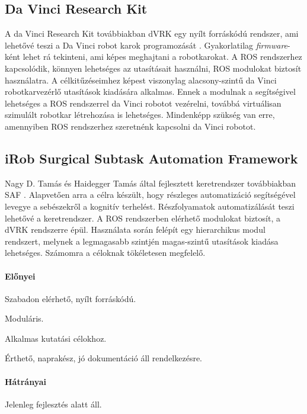 \documentclass[12pt,a4paper,oneside]{report} %
\begin{document}
\subsection{Da Vinci Research Kit}
\label{davinci}
A da Vinci Research Kit továbbiakban dVRK egy nyílt forráskódú rendszer, ami lehetővé teszi a Da Vinci robot karok programozását \cite{kazanzides2014open}. Gyakorlatilag \textit{firmware}-ként lehet rá tekinteni, ami képes meghajtani a robotkarokat.  A ROS rendszerhez kapcsolódik, könnyen lehetséges az utasításait használni, ROS  modulokat biztosít használatra.  A célkitűzéseimhez képest viszonylag alacsony-szintű da Vinci robotkarvezérlő utasítások kiadására alkalmas.
Ennek a modulnak a segítségivel lehetséges a ROS rendszerrel da Vinci robotot vezérelni, továbbá virtuálisan szimulált robotkar létrehozása is lehetséges. Mindenképp szükség van erre, amennyiben ROS rendszerhez szeretnénk kapcsolni da Vinci robotot. 
\subsection{iRob Surgical Subtask Automation Framework}
\label{irob}
Nagy D. Tamás és Haidegger Tamás által fejlesztett keretrendszer továbbiakban SAF \cite{irobsaf2019}.
Alapvetően arra a célra készült, hogy részleges automatizáció segítségével levegye a sebészekről a kognitív terhelést. Részfolyamatok automatizálását teszi lehetővé a keretrendszer. A ROS rendszerben elérhető modulokat biztosít, a dVRK rendszerre épül. Használata során felépít egy hierarchikus modul rendszert, melynek a legmagasabb szintjén magas-szintű utasítások kiadása lehetséges. Számomra a céloknak tökéletesen megfelelő.
\paragraph{Előnyei} 
\begin{compactitem}
	\item Szabadon elérhető, nyílt forráskódú.
	\item Moduláris.
	\item Alkalmas kutatási célokhoz.
	\item Érthető, naprakész, jó dokumentáció áll rendelkezésre.
\end{compactitem}
\paragraph{Hátrányai} 
\begin{compactitem}
	\item Jelenleg fejlesztés alatt áll.
\end{compactitem}
\end{document}
